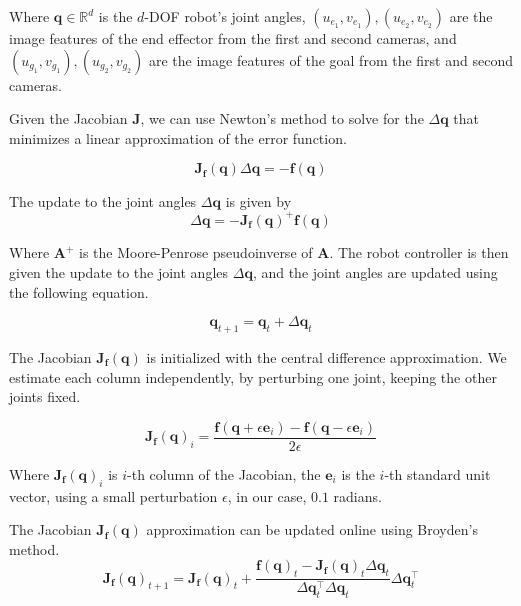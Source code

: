\documentclass[letterpaper, 10 pt, conference]{ieeeconf}  %
\begin{document}
Where $\mathbf{q} \in \mathbb{R}^d$ is the $d$-DOF robot's joint angles,
$(u_{e_1}, v_{e_1}), (u_{e_2}, v_{e_2})$ are the image features of the end
effector from the first and second cameras, and $(u_{g_1}, v_{g_1}), (u_{g_2},
v_{g_2})$ are the image features of the goal from the first and second cameras.

Given the Jacobian $\mathbf{J}$, we can use Newton's method to solve
for the $\Delta \mathbf{q}$ that minimizes a linear approximation of the error
function.

\begin{equation}
    \mathbf{J}_{\mathbf{f}}(\mathbf{q}) \Delta \mathbf{q} = -\mathbf{f}(\mathbf{q})
\end{equation}

The update to the joint angles $\Delta \mathbf{q}$ is given by
\begin{equation}
    \Delta \mathbf{q} = -\mathbf{J}_{\mathbf{f}}(\mathbf{q})^{+} \mathbf{f}(\mathbf{q})
\end{equation}

Where $\mathbf{A}^{+}$ is the Moore-Penrose pseudoinverse of $\mathbf{A}$. The
robot controller is then given the update to the joint angles $\Delta \mathbf{q}$,
and the joint angles are updated using the following equation.

\begin{equation}
    \mathbf{q}_{t+1} = \mathbf{q}_t + \Delta \mathbf{q}_t
\end{equation}

The Jacobian $\mathbf{J}_{\mathbf{f}}(\mathbf{q})$ is initialized with the
central difference approximation. We estimate each column independently,
by perturbing one joint, keeping the other joints fixed.

\begin{equation}
    \mathbf{J}_{\mathbf{f}}(\mathbf{q})_i = \frac{\mathbf{f}(\mathbf{q} + \epsilon \mathbf{e}_i) - \mathbf{f}(\mathbf{q} - \epsilon \mathbf{e}_i)}{2 \epsilon}
\end{equation}

Where $\mathbf{J}_{\mathbf{f}}(\mathbf{q})_i$ is $i$-th column of the Jacobian,
the $\mathbf{e}_i$ is the $i$-th standard unit vector, using a small
perturbation $\epsilon$, in our case, $0.1$ radians.

The Jacobian $\mathbf{J}_{\mathbf{f}}(\mathbf{q})$ approximation can be updated online
using Broyden's method.
\begin{equation}
    \mathbf{J}_{\mathbf{f}}(\mathbf{q})_{t+1} = \mathbf{J}_{\mathbf{f}}(\mathbf{q})_t + \frac{\mathbf{f}(\mathbf{q})_t - \mathbf{J}_{\mathbf{f}}(\mathbf{q})_t \Delta \mathbf{q}_t}{\Delta \mathbf{q}_t^\top \Delta \mathbf{q}_t} \Delta \mathbf{q}_t^\top
\end{equation}
\end{document}
